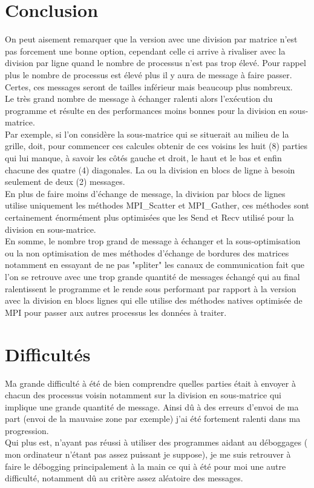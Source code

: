 \documentclass[10pt,a4paper]{article}
\begin{document}
\section{Conclusion}
On peut aisement remarquer que la version avec une division par matrice n'est pas forcement une bonne option, cependant celle ci arrive à rivaliser avec la division par ligne quand le nombre de processus n'est pas trop élevé. Pour rappel plus le nombre de processus est élevé plus il y aura de message à faire passer. Certes, ces messages seront de tailles inférieur mais beaucoup plus nombreux.\\
Le très grand nombre de message à échanger ralenti alors l'exécution du programme et résulte en des performances moins bonnes pour la division en sous-matrice.\\

Par exemple, si l'on considère la sous-matrice qui se situerait au milieu de la grille, doit, pour commencer ces calcules obtenir de ces voisins les huit (8) parties qui lui manque, à savoir les côtés gauche et droit, le haut et le bas et enfin chacune des quatre (4) diagonales. La ou la division en blocs de ligne à besoin seulement de deux (2) messages. \\

En plus de faire moins d'échange de message, la division par blocs de lignes utilise uniquement les méthodes MPI\_Scatter et MPI\_Gather, ces méthodes sont certainement énormément plus optimisées que les Send et Recv utilisé pour la division en sous-matrice.\\

En somme, le nombre trop grand de message à échanger et la sous-optimisation ou la non optimisation de mes méthodes d'échange de bordures des matrices notamment en essayant de ne pas "spliter" les canaux de communication fait que l'on se retrouve avec une trop grande quantité de messages échangé qui au final ralentissent le programme et le rende sous performant par rapport à la version avec la division en blocs lignes qui elle utilise des méthodes natives optimisée de MPI pour passer aux autres processus les données à traiter. 

\section{Difficultés}
Ma grande difficulté à été de bien comprendre quelles parties était à envoyer à chacun des processus voisin notamment sur la division en sous-matrice qui implique une grande quantité de message. Ainsi dû à des erreurs d'envoi de ma part (envoi de la mauvaise zone par exemple) j'ai été fortement ralenti dans ma progression. \\

Qui plus est, n'ayant pas réussi à utiliser des programmes aidant au déboggages ( mon ordinateur n'étant pas assez puissant je suppose), je me suis retrouver à faire le débogging principalement à la main ce qui à été pour moi une autre difficulté, notamment dû au critère assez aléatoire des messages.
\end{document}
